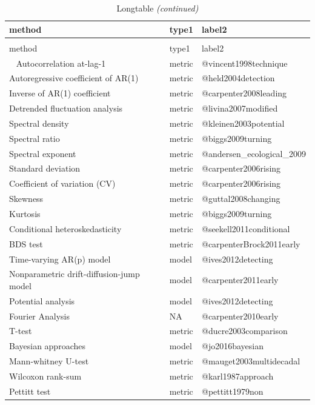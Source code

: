 \documentclass[12pt,twoside,openany]{reedthesis}
\begin{document}
\begin{longtable}{lll}
\caption{\label{tab:methodsMetricsListTab}Longtable}\\
\toprule
method & type1 & label2\\
\midrule
\endfirsthead
\caption[]{\label{tab:methodsMetricsListTab}Longtable \textit{(continued)}}\\
\toprule
method & type1 & label2\\
\midrule
\endhead
\
\endfoot
\bottomrule
\endlastfoot
Autocorrelation at-lag-1 & metric & @vincent1998technique\\
Autoregressive coefficient of AR(1) & metric & @held2004detection\\
Inverse of AR(1) coefficient & metric & @carpenter2008leading\\
Detrended fluctuation analysis & metric & @livina2007modified\\
Spectral density & metric & @kleinen2003potential\\
\addlinespace
Spectral ratio & metric & @biggs2009turning\\
Spectral exponent & metric & @andersen\_ecological\_2009\\
Standard deviation & metric & @carpenter2006rising\\
Coefficient of variation (CV) & metric & @carpenter2006rising\\
Skewness & metric & @guttal2008changing\\
\addlinespace
Kurtosis & metric & @biggs2009turning\\
Conditional heteroskedasticity & metric & @seekell2011conditional\\
BDS test & metric & @carpenterBrock2011early\\
Time-varying AR(p) model & model & @ives2012detecting\\
Nonparametric drift-diffusion-jump model & model & @carpenter2011early\\
\addlinespace
Potential analysis & model & @ives2012detecting\\
Fourier Analysis & NA & @carpenter2010early\\
T-test & metric & @ducre2003comparison\\
Bayesian approaches & model & @jo2016bayesian\\
Mann-whitney U-test & metric & @mauget2003multidecadal\\
\addlinespace
Wilcoxon rank-sum & metric & @karl1987approach\\
Pettitt test & metric & @pettitt1979non\\

\end{longtable}
\end{document}
